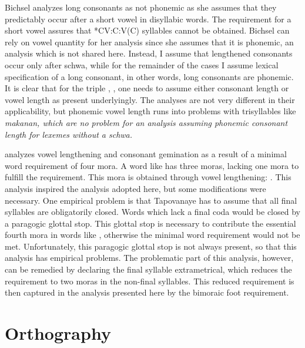Bichsel analyzes long consonants as not phonemic as she assumes that they predictably occur after a short vowel in disyllabic words. The requirement for a short vowel assures that *CV:C:V(C) syllables cannot be obtained. Bichsel can rely on vowel quantity for her analysis since she assumes that it is phonemic, an analysis which is not shared here. Instead, I assume that lengthened consonants occur only after schwa, while for the remainder of the cases I assume lexical specification of a long consonant, in other words, long consonants are phonemic. It is clear that for the triple , ,  one needs to assume either consonant length or vowel length as present underlyingly. The analyses are not very different in their applicability, but phonemic vowel length runs into problems with trisyllables like \em makanan\em, which are no problem for an analysis assuming phonemic consonant length for lexemes without a schwa.


\citet{Tapovanaye1995} analyzes vowel lengthening and consonant gemination as a result of a minimal word requirement of four mora. A word like  has three moras, lacking one mora to fulfill the requirement. This mora is obtained through vowel lengthening: . This analysis inspired the analysis adopted here, but some modifications were necessary. One empirical problem is that Tapovanaye has to assume that all final syllables are obligatorily closed. Words which lack a final coda would be closed by a paragogic glottal stop. This glottal stop is necessary to contribute the essential fourth mora in words like  , otherwise the minimal word requirement would not be met. Unfortunately, this paragogic glottal stop is not always present, so that this analysis has empirical problems. The problematic part of this analysis, however, can be remedied by declaring the final syllable extrametrical, which reduces the requirement to two moras in the non-final syllables. This reduced requirement is then captured in the analysis presented here by the bimoraic foot requirement.

% 

\section{Orthography}\label{sec:phon:Orthography}

